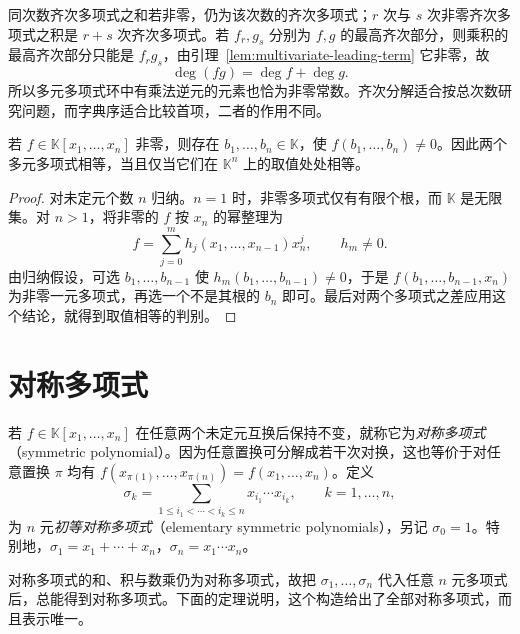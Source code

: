 同次数齐次多项式之和若非零，仍为该次数的齐次多项式；$r$ 次与 $s$ 次非零齐次多项式之积是 $r+s$ 次齐次多项式。若 $f_r,g_s$ 分别为 $f,g$ 的最高齐次部分，则乘积的最高齐次部分只能是 $f_rg_s$，由引理~\ref{lem:multivariate-leading-term} 它非零，故
\[
    \deg(fg)=\deg f+\deg g.
\]
所以多元多项式环中有乘法逆元的元素也恰为非零常数。齐次分解适合按总次数研究问题，而字典序适合比较首项，二者的作用不同。

\begin{theorem}
\label{thm:multivariate-polynomial-functions}
若 $f\in\mathbb K[x_1,\ldots,x_n]$ 非零，则存在 $b_1,\ldots,b_n\in\mathbb K$，使 $f(b_1,\ldots,b_n)\ne0$。因此两个多元多项式相等，当且仅当它们在 $\mathbb K^n$ 上的取值处处相等。
\end{theorem}
\begin{proof}
对未定元个数 $n$ 归纳。$n=1$ 时，非零多项式仅有有限个根，而 $\mathbb K$ 是无限集。对 $n>1$，将非零的 $f$ 按 $x_n$ 的幂整理为
\[
    f=\sum_{j=0}^m h_j(x_1,\ldots,x_{n-1})x_n^j,
    \qquad h_m\ne0.
\]
由归纳假设，可选 $b_1,\ldots,b_{n-1}$ 使 $h_m(b_1,\ldots,b_{n-1})\ne0$，于是 $f(b_1,\ldots,b_{n-1},x_n)$ 为非零一元多项式，再选一个不是其根的 $b_n$ 即可。最后对两个多项式之差应用这个结论，就得到取值相等的判别。
\end{proof}

\section{对称多项式}
\label{sec:symmetric-polynomials}

\begin{definition}
若 $f\in\mathbb K[x_1,\ldots,x_n]$ 在任意两个未定元互换后保持不变，就称它为\emph{对称多项式}（symmetric polynomial）。因为任意置换可分解成若干次对换，这也等价于对任意置换 $\pi$ 均有 $f(x_{\pi(1)},\ldots,x_{\pi(n)})=f(x_1,\ldots,x_n)$。定义
\[
    \sigma_k=\sum_{1\leq i_1<\cdots<i_k\leq n}x_{i_1}\cdots x_{i_k},
    \qquad k=1,\ldots,n,
\]
为 $n$ 元\emph{初等对称多项式}（elementary symmetric polynomials），另记 $\sigma_0=1$。特别地，$\sigma_1=x_1+\cdots+x_n$，$\sigma_n=x_1\cdots x_n$。
\end{definition}

对称多项式的和、积与数乘仍为对称多项式，故把 $\sigma_1,\ldots,\sigma_n$ 代入任意 $n$ 元多项式后，总能得到对称多项式。下面的定理说明，这个构造给出了全部对称多项式，而且表示唯一。

